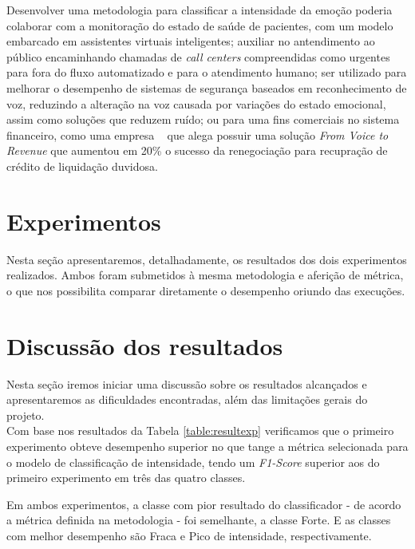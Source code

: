 Desenvolver uma metodologia para classificar a intensidade da emoção poderia colaborar com a monitoração do estado de saúde de pacientes, com um modelo embarcado em assistentes virtuais inteligentes; auxiliar no antendimento ao público encaminhando chamadas de \textit{call centers} compreendidas como urgentes para fora do fluxo automatizado e para o atendimento humano; ser utilizado para melhorar o desempenho de sistemas de segurança baseados em reconhecimento de voz, reduzindo a alteração na voz causada por variações do estado emocional, assim como soluções que reduzem ruído; ou para uma fins comerciais no sistema financeiro, como uma empresa ~\cite{bsignal0} que alega possuir uma solução \textit{From Voice to Revenue} que aumentou em 20\% o sucesso da renegociação para recupração de crédito de liquidação duvidosa.


\section{Experimentos}

Nesta seção apresentaremos, detalhadamente, os resultados dos dois experimentos realizados. Ambos foram submetidos à mesma metodologia e aferição de métrica, o que nos possibilita comparar diretamente o desempenho oriundo das execuções.\\




\clearpage

\section{Discussão dos resultados}

Nesta seção iremos iniciar uma discussão sobre os resultados alcançados e apresentaremos as dificuldades encontradas, além das limitações gerais do projeto.\\

Com base nos resultados da Tabela \ref{table:resultexp} verificamos que o primeiro experimento obteve desempenho superior no que tange a métrica selecionada para o modelo de classificação de intensidade, tendo um \textit{F1-Score} superior aos do primeiro experimento em três das quatro classes.

Em ambos experimentos, a classe com pior resultado do classificador - de acordo a métrica definida na metodologia - foi semelhante, a classe Forte. E as classes com melhor desempenho são Fraca e Pico de intensidade, respectivamente.

